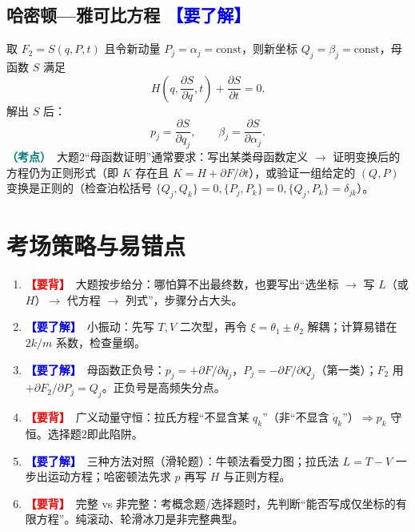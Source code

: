 \documentclass[UTF8,a4paper,11pt]{ctexart}
\newcommand{\bp}[1]{\textcolor{red}{\textbf{【要背】}}\ #1}
\newcommand{\uf}[1]{\textcolor{blue}{\textbf{【要了解】}}\ #1}
\newcommand{\imp}[1]{\textcolor{teal}{\textbf{（考点）}}\ #1}
\begin{document}
\subsection{哈密顿—雅可比方程 \uf{}}
取 $F_2=S(q,P,t)$ 且令新动量 $P_j=\alpha_j=\text{const}$，则新坐标 $Q_j=\beta_j=\text{const}$，母函数 $S$ 满足
\[
\boxed{H\!\left(q,\frac{\partial S}{\partial q},t\right)+\frac{\partial S}{\partial t}=0.}
\]
解出 $S$ 后：
\[
p_j=\frac{\partial S}{\partial q_j},\qquad \beta_j=\frac{\partial S}{\partial\alpha_j}.
\]
\imp{大题2“母函数证明”通常要求：写出某类母函数定义 $\rightarrow$ 证明变换后的方程仍为正则形式（即 $K$ 存在且 $K=H+\partial F/\partial t$），或验证一组给定的 $(Q,P)$ 变换是正则的（检查泊松括号 $\{Q_j,Q_k\}=0,\{P_j,P_k\}=0,\{Q_j,P_k\}=\delta_{jk}$）。}

\section{考场策略与易错点}
\begin{enumerate}[itemsep=3pt]
  \item \bp{大题按步给分}：哪怕算不出最终数，也要写出“选坐标 $\rightarrow$ 写 $L$（或 $H$）$\rightarrow$ 代方程 $\rightarrow$ 列式”，步骤分占大头。
  \item \uf{小振动}：先写 $T,V$ 二次型，再令 $\xi=\theta_1\pm\theta_2$ 解耦；计算易错在 $2k/m$ 系数，检查量纲。
  \item \uf{母函数正负号}：$p_j=+\partial F/\partial q_j$，$P_j=-\partial F/\partial Q_j$（第一类）；$F_2$ 用 $+\partial F_2/\partial P_j=Q_j$。正负号是高频失分点。
  \item \bp{广义动量守恒}：拉氏方程“不显含某 $q_k$”（非“不显含 $\dot q_k$”）$\Rightarrow p_k$ 守恒。选择题2即此陷阱。
  \item \uf{三种方法对照}（滑轮题）：牛顿法看受力图；拉氏法 $L=T-V$ 一步出运动方程；哈密顿法先求 $p$ 再写 $H$ 与正则方程。
  \item \bp{完整 vs 非完整}：考概念题/选择题时，先判断“能否写成仅坐标的有限方程”。纯滚动、轮滑冰刀是非完整典型。
\end{enumerate}
\end{document}
